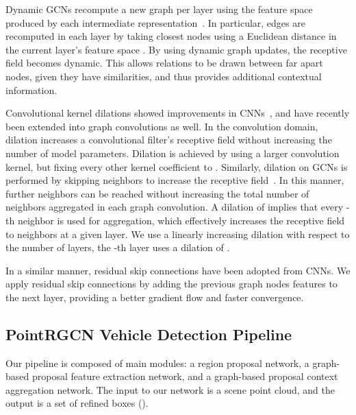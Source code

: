 \documentclass[10pt,twocolumn,letterpaper]{article}
\begin{document}
Dynamic GCNs recompute a new graph per layer using the feature space produced by each intermediate representation~\cite{wang2019deep}.
In particular, edges  are recomputed in each layer by taking  closest nodes using a Euclidean distance in the current layer's feature space .
By using dynamic graph updates, the receptive field becomes dynamic.
This allows relations to be drawn between far apart nodes, given they have similarities, and thus provides additional contextual information.














Convolutional kernel dilations showed improvements in CNNs~\cite{yu2015multi}, and have recently been extended into graph convolutions as well.
In the convolution domain, dilation increases a convolutional filter's receptive field without increasing the number of model parameters.
Dilation is achieved by using a larger convolution kernel, but fixing every other kernel coefficient to .
Similarly, dilation on GCNs is performed by skipping neighbors to increase the receptive field~\cite{Li2019deepgcn}.
In this manner, further neighbors can be reached without increasing the total number of neighbors aggregated in each graph convolution.
A dilation of  implies that every -th neighbor is used for aggregation, which effectively increases the receptive field to  neighbors at a given layer.
We use a linearly increasing dilation with respect to the number of layers, \ie the -th layer uses a dilation of .

In a similar manner, residual skip connections have been adopted from CNNs.
We apply residual skip connections by adding the previous graph nodes features to the next layer, providing a better gradient flow and faster convergence.






\subsection{PointRGCN Vehicle Detection Pipeline}
Our pipeline is composed of  main modules: a region proposal network, a graph-based proposal feature extraction network, and a graph-based proposal context aggregation network.
The input to our network is a scene point cloud, and the output is a set of refined boxes \Rc ().
\end{document}
